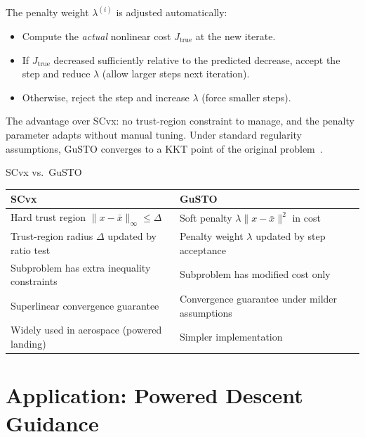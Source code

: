 The penalty weight $\lambda^{(i)}$ is adjusted automatically:
\begin{itemize}[nosep]
	\item Compute the \emph{actual} nonlinear cost $J_{\text{true}}$ at the new iterate.
	\item If $J_{\text{true}}$ decreased sufficiently relative to the predicted decrease, accept the step and reduce $\lambda$ (allow larger steps next iteration).
	\item Otherwise, reject the step and increase $\lambda$ (force smaller steps).
\end{itemize}

The advantage over SCvx: no trust-region constraint to manage, and the penalty parameter adapts without manual tuning. Under standard regularity assumptions, GuSTO converges to a KKT point of the original problem~\cite{Bonalli2019}.

\begin{summarybox}{SCvx vs.\ GuSTO}
	\begin{center}
		\renewcommand{\arraystretch}{1.3}
		\begin{tabular}{p{} p{}}
			\toprule
			\textbf{SCvx} & \textbf{GuSTO} \\
			\midrule
			Hard trust region $\|x - \bar{x}\|_\infty \le \Delta$ & Soft penalty $\lambda\|x - \bar{x}\|^2$ in cost \\
			Trust-region radius $\Delta$ updated by ratio test & Penalty weight $\lambda$ updated by step acceptance \\
			Subproblem has extra inequality constraints & Subproblem has modified cost only \\
			Superlinear convergence guarantee & Convergence guarantee under milder assumptions \\
			Widely used in aerospace (powered landing) & Simpler implementation \\
			\bottomrule
		\end{tabular}
	\end{center}
\end{summarybox}


\section{Application: Powered Descent Guidance}
\label{sec:rocket_landing}

